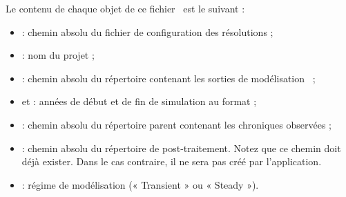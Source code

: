 \vspace{-0.6cm}
Le contenu de chaque objet de ce fichier \json~est le suivant :
\begin{itemize}
    \item {} : chemin absolu du fichier de configuration des résolutions ;

    \item {} : nom du projet ;

    \item {} : chemin absolu du répertoire contenant les sorties de modélisation \cawaqs~;

    \item {} et  : années de début et de fin de simulation au format  ;

    \item {} : chemin absolu du répertoire parent contenant les chroniques observées ;

    \item {} : chemin absolu du répertoire de post-traitement. Notez que ce chemin doit déjà exister. Dans le cas contraire, il ne sera pas créé par l'application.

    \item {} : régime de modélisation (« Transient » ou « Steady »).
\end{itemize}
